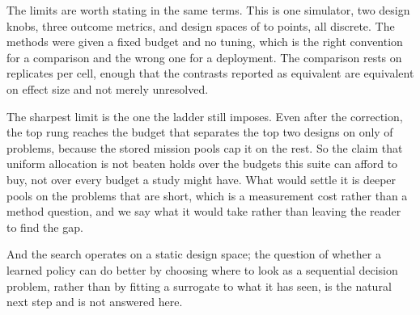 \documentclass[11pt]{article}
\begin{document}
The limits are worth stating in the same terms. This is one simulator, two design knobs, three
outcome metrics, and design spaces of \BnDesignsMin{} to \BnDesignsMax{} points, all discrete. The
methods were given a fixed budget and no tuning, which is the right convention for a comparison and
the wrong one for a deployment. The comparison rests on \RsReplicates{} replicates per cell, enough
that the contrasts reported as equivalent are equivalent on effect size and not merely unresolved.

The sharpest limit is the one the ladder still imposes. Even after the correction, the top rung
reaches the budget that separates the top two designs on only \RsReachSep{} of \RsLadderHave{}
problems, because the stored mission pools cap it on the rest. So the claim that uniform allocation
is not beaten holds over the budgets this suite can afford to buy, not over every budget a study
might have. What would settle it is deeper pools on the problems that are short, which is a
measurement cost rather than a method question, and we say what it would take rather than leaving
the reader to find the gap.

And the search operates on a static design space; the question of whether a learned policy can do
better by choosing where to look as a sequential decision problem, rather than by fitting a
surrogate to what it has seen, is the natural next step and is not answered here.



\end{document}
